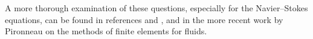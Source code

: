 A more thorough examination of these questions, especially for the
Navier--Stokes equations, can be found in references \cite{ciarlet78} and
\cite{raviart86}, and in the more recent work by Pironneau \cite{pironneau88}
on the methods of finite elements for fluids.



%
%
